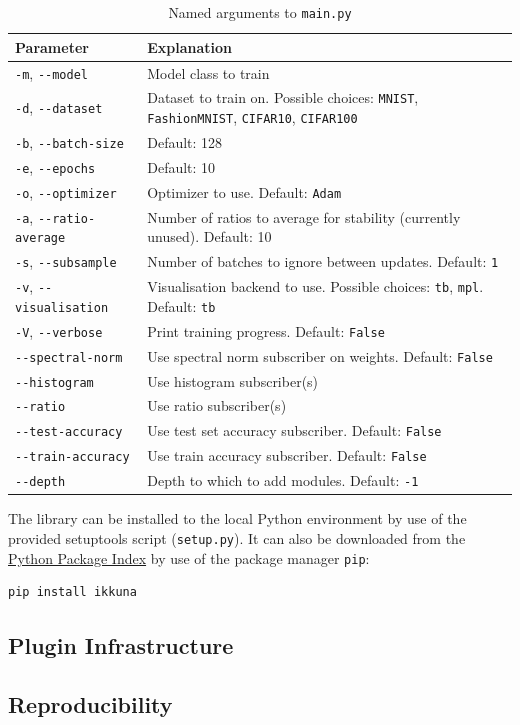 \begin{table}
    \caption{Named arguments to \texttt{main.py}}
    \begin{tabularx}{\linewidth}{lX}
        \toprule
        Parameter                                   & Explanation\tabularnewline
        \midrule
        \lstinline{-m}, \lstinline{--model}         & Model class to train\tabularnewline
        \lstinline{-d}, \lstinline{--dataset}       & Dataset to train on. Possible choices: \lstinline{MNIST}, \lstinline{FashionMNIST}, \lstinline{CIFAR10}, \lstinline{CIFAR100}\tabularnewline
        \lstinline{-b}, \lstinline{--batch-size}    & Default: 128\tabularnewline
        \lstinline{-e}, \lstinline{--epochs}        & Default: 10\tabularnewline
        \lstinline{-o}, \lstinline{--optimizer}     & Optimizer to use. Default: \lstinline{Adam}\tabularnewline
        \lstinline{-a}, \lstinline{--ratio-average} & Number of ratios to average for stability (currently unused). Default: 10\tabularnewline
        \lstinline{-s}, \lstinline{--subsample}     & Number of batches to ignore between updates. Default: \lstinline{1}\tabularnewline
        \lstinline{-v}, \lstinline{--visualisation} & Visualisation backend to use. Possible choices: \lstinline{tb}, \lstinline{mpl}. Default: \lstinline{tb}\tabularnewline
        \lstinline{-V}, \lstinline{--verbose}       & Print training progress. Default: \lstinline{False}\tabularnewline
        \lstinline{--spectral-norm}                 & Use spectral norm subscriber on weights. Default: \lstinline{False}\tabularnewline
        \lstinline{--histogram}                     & Use histogram subscriber(s)\tabularnewline
        \lstinline{--ratio}                         & Use ratio subscriber(s)\tabularnewline
        \lstinline{--test-accuracy}                 & Use test set accuracy subscriber. Default: \lstinline{False}\tabularnewline
        \lstinline{--train-accuracy}                & Use train accuracy subscriber. Default: \lstinline{False}\tabularnewline
        \lstinline{--depth}                         & Depth to which to add modules.  Default: \lstinline{-1}\tabularnewline
        \bottomrule
    \end{tabularx}
\end{table}

The library can be installed to the local Python environment by use of the
provided setuptools script (\texttt{setup.py}). It can also be downloaded from
the \href{https://pypi.org/}{Python Package Index} by use of the package manager
\texttt{pip}:

\begin{lstlisting}[language=Python]
pip install ikkuna
\end{lstlisting}

\hypertarget{plugin-infrastructure}{%
\subsection{Plugin Infrastructure}\label{plugin-infrastructure}}

\hypertarget{sec:reproducibility}{%
\subsection{Reproducibility}\label{sec:reproducibility}}
